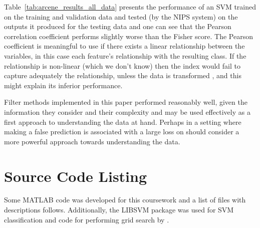\documentclass[12pt,a4paper,twocolumn]{article}
\begin{document}
Table~\ref{tab:arcene_results_all_data} presents the performance of an SVM trained  on the training and validation data and tested (by the NIPS system) on the outputs it produced for the testing data and one can see that the Pearson correlation coefficient performs slightly worse than the Fisher score. The Pearson coefficient is meaningful to use if there exists a linear relationship between the variables, in this case each feature's relationship with the resulting class. If the relationship is non-linear (which we don't know) then the index would fail to capture adequately the relationship, unless the  data is transformed \citep{garcia:correlation_tutorial}, and this might explain its inferior performance.

Filter methods implemented in this paper performed reasonably well, given the information they consider and their complexity and may be used effectively as a first approach to understanding the data at hand. Perhaps in a setting where making a false prediction is associated with a large loss on should consider a more powerful approach towards understanding the data.



{\footnotesize	 }

\appendix

\section{Source Code Listing}
Some MATLAB code was developed for this coursework and a list of files with descriptions follows. Additionally, the LIBSVM \citep{libsvm} package was used for SVM classification and code for performing grid search by \citep{website:kitipat_heatmap}.
\end{document}
